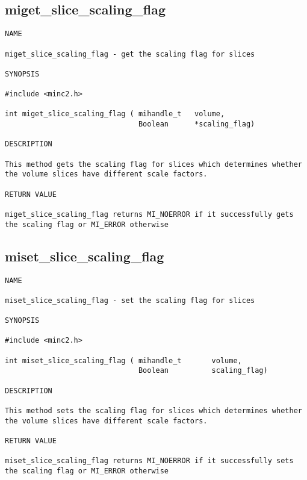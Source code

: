 \documentclass{article}
\begin{document}
\subsection{miget\_slice\_scaling\_flag}
\begin{verbatim}
NAME 

miget_slice_scaling_flag - get the scaling flag for slices

SYNOPSIS

#include <minc2.h>

int miget_slice_scaling_flag ( mihandle_t   volume,
                               Boolean      *scaling_flag)
                                
DESCRIPTION

This method gets the scaling flag for slices which determines whether 
the volume slices have different scale factors. 

RETURN VALUE

miget_slice_scaling_flag returns MI_NOERROR if it successfully gets 
the scaling flag or MI_ERROR otherwise
\end{verbatim}

\subsection{miset\_slice\_scaling\_flag}
\begin{verbatim}
NAME 

miset_slice_scaling_flag - set the scaling flag for slices

SYNOPSIS

#include <minc2.h>

int miset_slice_scaling_flag ( mihandle_t       volume,
                               Boolean          scaling_flag)
                                
DESCRIPTION

This method sets the scaling flag for slices which determines whether 
the volume slices have different scale factors.

RETURN VALUE

miset_slice_scaling_flag returns MI_NOERROR if it successfully sets 
the scaling flag or MI_ERROR otherwise
\end{verbatim}
\end{document}
